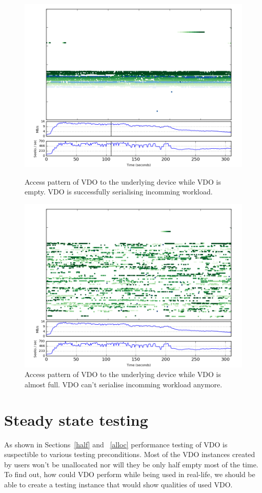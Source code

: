 \documentclass[
  color, %
  table, %
  lof,   %
  lot,   %
]{fithesis3}
\begin{document}
\begin{figure}[!htb]
        \centering
        \includegraphics[width=\textwidth]{../results/half/start}
\caption[Access pattern of VDO with enough free space]{Access pattern of VDO to the underlying device while VDO is empty. VDO is successfully serialising incomming workload.}
\label{fig:half-start}
        \centering
        \includegraphics[width=\textwidth]{../results/half/end}
\caption[Access pattern of VDO running out of free space]{Access pattern of VDO to the underlying device while VDO is almost full. VDO can't serialise incomming workload anymore.}
\label{fig:half-end}
\end{figure}


\section{Steady state testing}
As shown in Sections~\ref{half} and ~\ref{alloc} performance testing of VDO is suspectible to various testing preconditions. Most of the VDO instances created by users won't be unallocated nor will they be only half empty most of the time. To find out, how could VDO perform while being used in real-life, we should be able to create a testing instance that would show qualities of used VDO.
\end{document}
